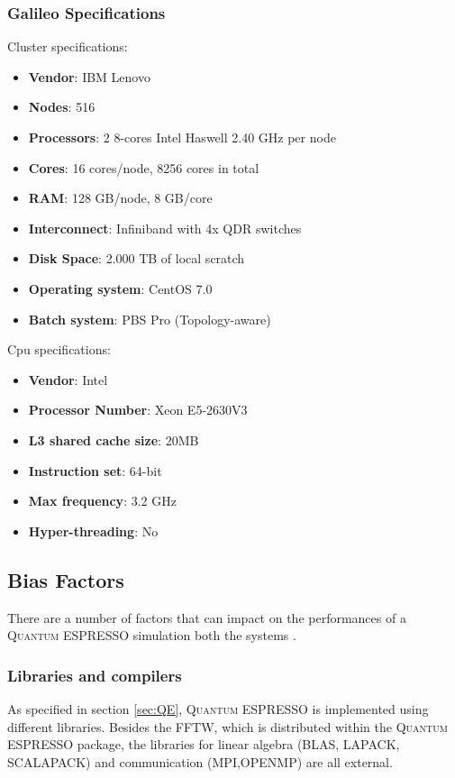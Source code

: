 \documentclass[a4paper,12pt]{article}
\newcommand\QE{\textsc{Quantum} ESPRESSO }
\begin{document}
\subsubsection{Galileo Specifications}

Cluster specifications: 
\begin{itemize}
\item \textbf{Vendor}: IBM Lenovo
\item \textbf{Nodes}: 516 
\item \textbf{Processors}: 2 8-cores Intel Haswell 2.40 GHz per node
\item \textbf{Cores}: 16 cores/node, 8256 cores in total
\item \textbf{RAM}: 128 GB/node, 8 GB/core
\item \textbf{Interconnect}: Infiniband with 4x QDR switches
\item \textbf{Disk Space}: 2.000 TB of local scratch
\item \textbf{Operating system}: CentOS 7.0
\item \textbf{Batch system}: PBS Pro (Topology-aware)
\end{itemize}

Cpu specifications:
\begin{itemize}
\item \textbf{Vendor}: Intel
\item \textbf{Processor Number}: Xeon E5-2630V3
\item \textbf{L3 shared cache size}: 20MB
\item \textbf{Instruction set}: 64-bit
\item \textbf{Max frequency}: 3.2 GHz
\item \textbf{Hyper-threading}: No 
\end{itemize}



\subsection{Bias Factors}

There are a number of factors that can impact on the performances of a \QE simulation both the systems	.

\subsubsection{Libraries and compilers}

As specified in section \ref{sec:QE}, \QE is implemented using different libraries. 
Besides the FFTW, which is distributed within the \QE package, the libraries for linear algebra (BLAS, LAPACK, SCALAPACK) and communication (MPI,OPENMP) are all external.
\end{document}
